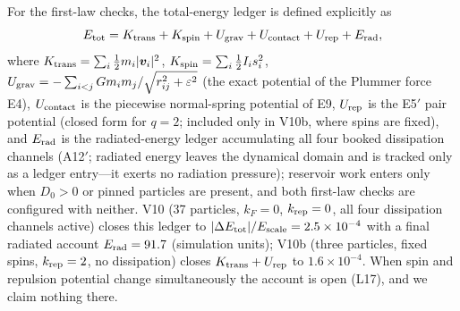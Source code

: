 \documentclass[aps,reprint,amsmath,amssymb,nofootinbib,superscriptaddress,floatfix]{revtex4-2}
\newcommand{\vect}[1]{\bm{#1}}
\newcommand{\Dz}{D_0}
\begin{document}
For the first-law checks, the total-energy ledger is defined
explicitly as
\begin{equation}
E_{\rm tot} = K_{\rm trans} + K_{\rm spin} + U_{\rm grav}
 + U_{\rm contact} + U_{\rm rep} + E_{\rm rad},
\label{eq:etot}
\end{equation}
where $K_{\rm trans} = \sum_i \tfrac12 m_i|\vect{v}_i|^2$,
$K_{\rm spin} = \sum_i \tfrac12 I_i s_i^2$,
$U_{\rm grav} = -\sum_{i<j} G m_i m_j/\sqrt{r_{ij}^2+\varepsilon^2}$
(the exact potential of the Plummer force E4),
$U_{\rm contact}$ is the piecewise normal-spring potential of E9,
$U_{\rm rep}$ is the E5$'$ pair potential (closed form for $q=2$;
included only in V10b, where spins are fixed), and $E_{\rm rad}$ is
the radiated-energy ledger accumulating all four booked dissipation
channels (A12$'$; radiated energy leaves the dynamical domain and is
tracked only as a ledger entry---it exerts no radiation pressure);
reservoir work enters only when $\Dz>0$ or pinned
particles are present, and both first-law checks are configured with
neither.
V10 (37 particles, $k_F = 0$, $k_{\rm rep}=0$, all four dissipation
channels active) closes this ledger to $|\Delta E_{\rm tot}|/E_{\rm scale} =
2.5\times10^{-4}$ with a final radiated account
$E_{\rm rad} = 91.7$ (simulation units); V10b (three particles, fixed
spins, $k_{\rm rep}=2$, no dissipation) closes
$K_{\rm trans}+U_{\rm rep}$ to $1.6\times10^{-4}$.
When spin and repulsion potential change simultaneously the account is
open (L17), and we claim nothing there.
\end{document}

